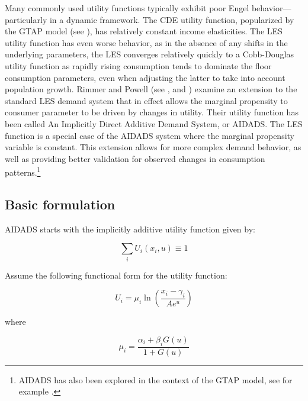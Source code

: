 
Many commonly used utility functions typically exhibit poor Engel behavior---particularly
in a dynamic framework. The CDE utility function, popularized by the GTAP model
(see \cite{Hertel1997}), has relatively constant income elasticities. The LES utility
function has even worse behavior, as in the absence of any shifts in the
underlying parameters, the LES converges relatively quickly to a Cobb-Douglas utility
function as rapidly rising consumption tends to dominate the floor consumption parameters,
even when adjusting the latter to take into account population growth.
Rimmer and Powell (see \cite{RimmerPowell1992A}, \cite{RimmerPowell1992B} and \cite{RimmerPowell1996})
examine an extension to the standard LES demand system that in effect allows the marginal
propensity to consumer parameter to be driven by changes in utility. Their utility function
has been called An Implicitly Direct Additive Demand System, or AIDADS. The LES function
is a special case of the AIDADS system where the marginal propensity variable is constant.
This extension allows for more complex demand behavior, as well as providing better validation for
observed changes in consumption patterns.\footnote{AIDADS has also been explored in the context
of the GTAP model, see for example \cite{Yuetal2003}.}

\subsection{Basic formulation}

AIDADS starts with the implicitly additive utility function given by:

\begin{equation}
\label{eq:AIDADSPRIMAL}
\sum\limits_i {{U_i}\left( {{x_i},u} \right) \equiv 1}
\end{equation}

\noindent Assume the following functional form for the utility function:

\begin{equation}
\label{eq:AIDADSU}
{U_i} = {\mu _i}\ln \left( {\frac{{{x_i} - {\gamma _i}}}{{A{e^u}}}} \right)
\end{equation}

\noindent where

\begin{equation}
\label{eq:AIDADSMPC}
\mu_i = \frac{{{\alpha_i} + {\beta_i}G\left( u \right)}}{{1 + G\left( u \right)}}
\end{equation}

